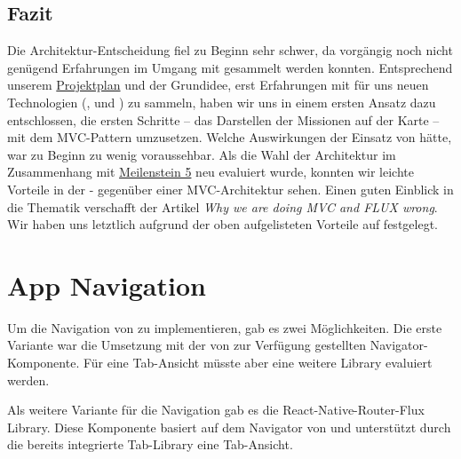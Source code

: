 \subsection{Fazit}
Die Architektur-Entscheidung fiel zu Beginn sehr schwer, da vorgängig noch nicht genügend Erfahrungen im Umgang mit  gesammelt werden konnten.
Entsprechend unserem \hyperref[pm-projektplan]{Projektplan} und der Grundidee, erst Erfahrungen mit für uns neuen Technologien (,  und ) zu sammeln, haben wir uns in einem ersten Ansatz dazu entschlossen, die ersten Schritte -- das Darstellen der Missionen auf der Karte -- mit dem \gls{MVC}-Pattern umzusetzen.
Welche Auswirkungen der Einsatz von  hätte, war zu Beginn zu wenig voraussehbar.\newline
Als die Wahl der Architektur im Zusammenhang mit \hyperref[pm-ms5]{Meilenstein 5} neu evaluiert wurde, konnten wir leichte Vorteile in der - gegenüber einer MVC-Architektur sehen.
Einen guten Einblick in die Thematik verschafft der Artikel \emph{Why we are doing MVC and FLUX wrong}\cite{mvc-vs-flux}.\newline
Wir haben uns letztlich aufgrund der oben aufgelisteten Vorteile auf  festgelegt.

\section{App Navigation}
Um die Navigation von \kort{} zu implementieren, gab es zwei Möglichkeiten. 
Die erste Variante war die Umsetzung mit der von  zur Verfügung gestellten Navigator-Komponente. 
Für eine Tab-Ansicht müsste aber eine weitere Library evaluiert werden. 

Als weitere Variante für die Navigation gab es die React-Native-Router-Flux Library. 
Diese Komponente basiert auf dem Navigator von  und unterstützt durch die bereits integrierte Tab-Library eine Tab-Ansicht.  

